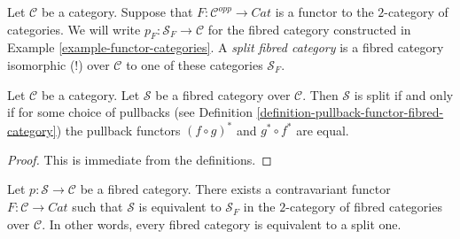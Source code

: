 \begin{definition}
\label{definition-split-fibred-category}
Let $\mathcal{C}$ be a category.
Suppose that $F : \mathcal{C}^{opp} \to \textit{Cat}$ is a functor
to the $2$-category of categories.
We will write $p_F : \mathcal{S}_F \to \mathcal{C}$ for the
fibred category constructed in
Example \ref{example-functor-categories}.
A {\it split fibred category} is a fibred category isomorphic (!)
over $\mathcal{C}$ to one of these categories {\it $\mathcal{S}_F$}.
\end{definition}

\begin{lemma}
\label{lemma-when-split}
Let $\mathcal{C}$ be a category.
Let $\mathcal{S}$ be a fibred category over $\mathcal{C}$.
Then $\mathcal{S}$ is split if and only if for some choice
of pullbacks (see Definition \ref{definition-pullback-functor-fibred-category})
the pullback functors
$(f \circ g)^*$ and $g^* \circ f^*$ are equal.
\end{lemma}

\begin{proof}
This is immediate from the definitions.
\end{proof}

\begin{lemma}
\label{lemma-fibred-strict}
Let $ p : \mathcal{S} \to \mathcal{C}$ be a fibred category.
There exists a contravariant functor $F : \mathcal{C} \to \textit{Cat}$
such that $\mathcal{S}$ is equivalent to $\mathcal{S}_F$
in the $2$-category of fibred categories over $\mathcal{C}$. In other
words, every fibred category is equivalent to a split one.
\end{lemma}

